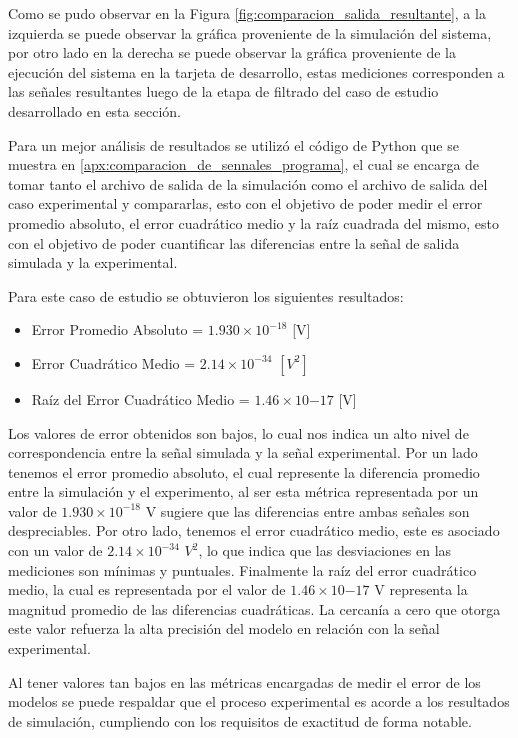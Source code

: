 Como se pudo observar en la Figura \ref{fig:comparacion_salida_resultante}, a la izquierda se puede observar la gráfica proveniente de la simulación del sistema, por otro lado en la derecha se puede observar la gráfica proveniente de la ejecución del sistema en la tarjeta de desarrollo, estas mediciones corresponden a las señales resultantes luego de la etapa de filtrado del caso de estudio desarrollado en esta sección. 

Para un mejor análisis de resultados se utilizó el código de Python que se muestra en \ref{apx:comparacion_de_sennales_programa}, el cual se encarga de tomar tanto el archivo de salida de la simulación como el archivo de salida del caso experimental y compararlas, esto con el objetivo de poder medir el error promedio absoluto, el error cuadrático medio y la raíz cuadrada del mismo, esto con el objetivo de poder cuantificar las diferencias entre la señal de salida simulada y la experimental.

Para este caso de estudio se obtuvieron los siguientes resultados:

\begin{itemize}
    \item Error Promedio Absoluto = $1.930 \times 10^{-18}$ [V]
    \item Error Cuadrático Medio = $2.14 \times 10^{-34}$ $[V^{2}]$
    \item Raíz del Error Cuadrático Medio = $1.46 \times 10{-17}$ [V]
\end{itemize}

Los valores de error obtenidos son bajos, lo cual nos indica un alto nivel de correspondencia entre la señal simulada y la señal experimental. Por un lado tenemos el error promedio absoluto, el cual represente la diferencia promedio entre la simulación y el experimento, al ser esta métrica representada por un valor de $1.930 \times 10^{-18}$ V sugiere que las diferencias entre ambas señales son despreciables. Por otro lado, tenemos el error cuadrático medio, este es asociado con un valor de $2.14 \times 10^{-34}$ $V^{2}$, lo que indica que las desviaciones en las mediciones son mínimas y puntuales. Finalmente la raíz del error cuadrático medio, la cual es representada por el valor de $1.46 \times 10{-17}$ V representa la magnitud promedio de las diferencias cuadráticas. La cercanía a cero que otorga este valor refuerza la alta precisión del modelo en relación con la señal experimental.

Al tener valores tan bajos en las métricas encargadas de medir el error de los modelos se puede respaldar que el proceso experimental es acorde a los resultados de simulación, cumpliendo con los requisitos de exactitud de forma notable.

